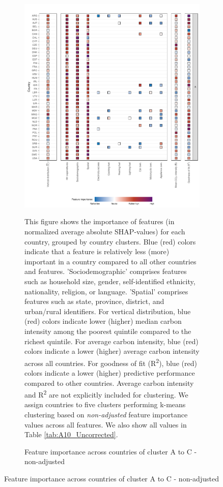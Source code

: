 \clearpage
\begin{figure}[ht!]
    \centering
    \caption{Feature importance across countries by cluster - Alternative clustering}\label{fig:fig_4_uncorrected}
    \begin{subfigure}[b]{\textwidth}
    \centering
    \includegraphics{1_Figures/Figure 4/Figure_4_Uncorrected_1.pdf}
    \caption{Feature importance across countries of cluster A to C - non-adjusted}\label{fig:fig_4_1_uncorrected}
     \begin{subcaption2}
    This figure shows the importance of features (in normalized average absolute SHAP-values) for each country, grouped by country clusters. Blue (red) colors indicate that a feature is relatively less (more) important in a country compared to all other countries and features. 'Sociodemographic' comprises features such as household size, gender, self-identified ethnicity, nationality, religion, or language. 'Spatial' comprises features such as state, province, district, and urban/rural identifiers. For vertical distribution, blue (red) colors indicate lower (higher) median carbon intensity among the poorest quintile compared to the richest quintile. For average carbon intensity, blue (red) colors indicate a lower (higher) average carbon intensity across all countries. For goodness of fit (R\textsuperscript{2}), blue (red) colors indicate a lower (higher) predictive performance compared to other countries. Average carbon intensity and R\textsuperscript{2} are not explicitly included for clustering.
    We assign countries to five clusters performing k-means clustering based on \textit{non-adjusted} feature importance values across all features. We also show all values in Table \ref{tab:A10_Uncorrected}.
    \end{subcaption2}
    \end{subfigure}
\end{figure}
\clearpage

